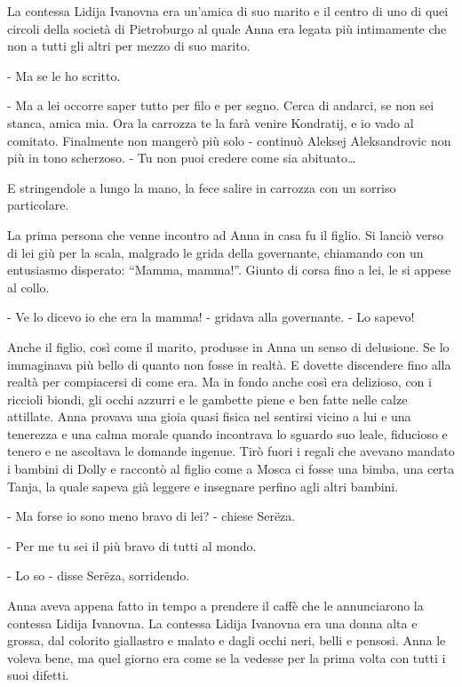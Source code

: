 La contessa Lidija Ivanovna era un'amica di suo marito e il centro di uno di quei circoli della società di Pietroburgo al quale Anna era legata più intimamente che non a tutti gli altri per mezzo di suo marito. 

- Ma se le ho scritto. 

- Ma a lei occorre saper tutto per filo e per segno. Cerca di andarci, se non sei stanca, amica mia. Ora la carrozza te la farà venire Kondratij, e io vado al comitato. Finalmente non mangerò più solo - continuò Aleksej Aleksandrovic non più in tono scherzoso. - Tu non puoi credere come sia abituato\ldots{} 

E stringendole a lungo la mano, la fece salire in carrozza con un sorriso particolare. 

\label{xxxii} 

La prima persona che venne incontro ad Anna in casa fu il figlio. Si lanciò verso di lei giù per la scala, malgrado le grida della governante, chiamando con un entusiasmo disperato: ``Mamma, mamma!''. Giunto di corsa fino a lei, le si appese al collo. 

- Ve lo dicevo io che era la mamma! - gridava alla governante. - Lo sapevo! 

Anche il figlio, così come il marito, produsse in Anna un senso di delusione. Se lo immaginava più bello di quanto non fosse in realtà. E dovette discendere fino alla realtà per compiacersi di come era. Ma in fondo anche così era delizioso, con i riccioli biondi, gli occhi azzurri e le gambette piene e ben fatte nelle calze attillate. Anna provava una gioia quasi fisica nel sentirsi vicino a lui e una tenerezza e una calma morale quando incontrava lo sguardo suo leale, fiducioso e tenero e ne ascoltava le domande ingenue. Tirò fuori i regali che avevano mandato i bambini di Dolly e raccontò al figlio come a Mosca ci fosse una bimba, una certa Tanja, la quale sapeva già leggere e insegnare perfino agli altri bambini. 

- Ma forse io sono meno bravo di lei? - chiese Serëza. 

- Per me tu sei il più bravo di tutti al mondo. 

- Lo so - disse Serëza, sorridendo. 

Anna aveva appena fatto in tempo a prendere il caffè che le annunciarono la contessa Lidija Ivanovna. La contessa Lidija Ivanovna era una donna alta e grossa, dal colorito giallastro e malato e dagli occhi neri, belli e pensosi. Anna le voleva bene, ma quel giorno era come se la vedesse per la prima volta con tutti i suoi difetti. 

